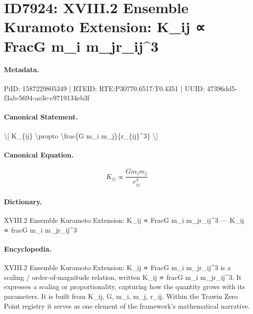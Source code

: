 \section*{ID7924: XVIII.2 Ensemble Kuramoto Extension: K\_ij ∝ FracG m\_i m\_jr\_ij\textasciicircum{}3}
\paragraph{Metadata.}
PiID: 1587229805349 | RTEID: RTE:P30770.6517:T0.4351 | UUID: 47396dd5-f3ab-5694-ae3e-c9719134eb3f

\paragraph{Canonical Statement.}
\textbackslash{}[ K\_\{ij\} \textbackslash{}propto \textbackslash{}frac\{G m\_i m\_j\}\{r\_\{ij\}\textasciicircum{}3\} \textbackslash{}]

\paragraph{Canonical Equation.}
\[
K_{ij} \propto \frac{G m_i m_j}{r_{ij}^3}
\]

\paragraph{Dictionary.}
XVIII.2 Ensemble Kuramoto Extension: K\_ij ∝ FracG m\_i m\_jr\_ij\textasciicircum{}3 — K\_ij ∝ fracG m\_i m\_jr\_ij\textasciicircum{}3

\paragraph{Encyclopedia.}
XVIII.2 Ensemble Kuramoto Extension: K\_ij ∝ FracG m\_i m\_jr\_ij\textasciicircum{}3 is a scaling / order-of-magnitude relation, written K\_ij ∝ fracG m\_i m\_jr\_ij\textasciicircum{}3. It expresses a scaling or proportionality, capturing how the quantity grows with its parameters. It is built from K\_ij, G, m\_i, m\_j, r\_ij. Within the Trawin Zero Point registry it serves as one element of the framework's mathematical narrative.
